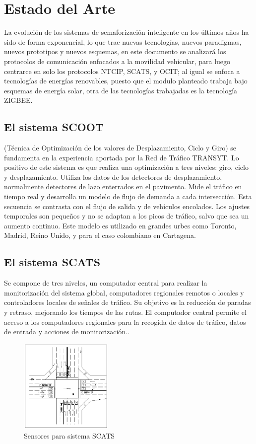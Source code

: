 \chapter{Estado del Arte}
La evolución de los sistemas de semaforización inteligente en los últimos años ha sido de forma exponencial, lo que trae nuevas tecnologías, nuevos paradigmas, nuevos prototipos y nuevos esquemas, en este documento se analizará los protocolos de comunicación enfocados a la movilidad vehicular, para luego centrarce en solo los protocolos NTCIP, SCATS, y OCIT; al igual se enfoca a tecnologías de energías renovables, puesto que el modulo planteado trabaja bajo esquemas de energía solar, otra de las tecnologías trabajadas es la tecnología ZIGBEE.

\section{El sistema SCOOT}
(Técnica de Optimización de los valores de Desplazamiento, Ciclo y Giro) se fundamenta en la experiencia aportada por la Red de Tráfico TRANSYT. Lo positivo de este sistema es que realiza una optimización a tres niveles: giro, ciclo y desplazamiento. Utiliza los datos de los detectores de desplazamiento, normalmente detectores de lazo enterrados en el pavimento. Mide el tráfico en tiempo real y desarrolla un modelo de flujo de demanda a cada intersección. Esta secuencia se contrasta con el flujo de salida y de vehículos encolados. Los ajustes temporales son pequeños y no se adaptan a los picos de tráfico, salvo que sea un aumento continuo. Este modelo es utilizado en grandes urbes como Toronto, Madrid, Reino Unido, y para el caso colombiano en Cartagena\cite{15}.

\section{El sistema SCATS}
Se compone de tres niveles, un computador central para realizar la monitorización del sistema global, computadores regionales remotos o locales y controladores locales de señales de tráfico. Su objetivo es la reducción de paradas y retraso, mejorando los tiempos de las rutas. 
El computador central permite el acceso a los computadores regionales para la  recogida de datos de tráfico, datos de entrada y acciones de monitorización.\cite{15}.
\begin{figure}[h]
    \centering
    \includegraphics[width=0.4\textwidth]{ima/cruce_phpcUjY57}
    \caption{Sensores para sistema SCATS \cite{18}}
    \label{fig:mesh7}
\end{figure}

